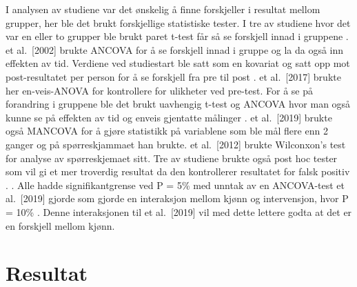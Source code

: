 \documentclass[
]{book}
\begin{document}
I analysen av studiene var det ønskelig å finne forskjeller i resultat mellom grupper, her ble det brukt forskjellige statistiske tester.
I tre av studiene hvor det var en eller to grupper ble brukt paret t-test får så se forskjell innad i gruppene \citetext{\citealp[ et al.~2012]{Geirsdottir}; \citealp[ et al.~2019]{vikberg}; \citealp[ et al.~2002]{vincent}}.
\citet{vincent} et al.~{[}2002{]} brukte ANCOVA for å se forskjell innad i gruppe og la da også inn effekten av tid.
Verdiene ved studiestart ble satt som en kovariat og satt opp mot post-resultatet per person for å se forskjell fra pre til post \citep[ et al.~2002]{vincent}.
\citet{Turpela} et al.~{[}2017{]} brukte her en-veis-ANOVA for kontrollere for ulikheter ved pre-test.
For å se på forandring i gruppene ble det brukt uavhengig t-test og ANCOVA hvor man også kunne se på effekten av tid og enveis gjentatte målinger \citetext{\citealp[Johnen, and Holfelder 2019]{Schott}; \citealp[ et al.~2017]{Turpela}; \citealp[ et al.~2019]{vikberg}; \citealp[ et al.~2002]{vincent}}.
\citet{Schott} et al.~{[}2019{]} brukte også MANCOVA for å gjøre statistikk på variablene som ble mål flere enn 2 ganger og på spørreskjammaet han brukte.
\citet{Geirsdottir} et al.~{[}2012{]} brukte Wilconxon's test for analyse av spørreskjemaet sitt.
Tre av studiene brukte også post hoc tester som vil gi et mer troverdig resultat da den kontrollerer resultatet for falsk positiv \citep[s.
50-52]{Hulley2013}.
\citetext{\citealp[Johnen, and Holfelder 2019]{Schott}; \citealp[ et al.~2017]{Turpela}; \citealp[ et al.~2002]{vincent}}.
Alle hadde signifikantgrense ved P = 5\% med unntak av en ANCOVA-test \citet{vikberg} et al.~{[}2019{]} gjorde som gjorde en interaksjon mellom kjønn og intervensjon, hvor P = 10\% \citetext{\citealp[ et al.~2012]{Geirsdottir}; \citealp[Johnen, and Holfelder 2019]{Schott}; \citealp[ et al.~2017]{Turpela}; \citealp[ et al.~2002]{vincent}}.
Denne interaksjonen til \citet{vikberg} et al.~{[}2019{]} vil med dette lettere godta at det er en forskjell mellom kjønn.

\hypertarget{resultat}{%
\section{Resultat}\label{resultat}}
\end{document}
